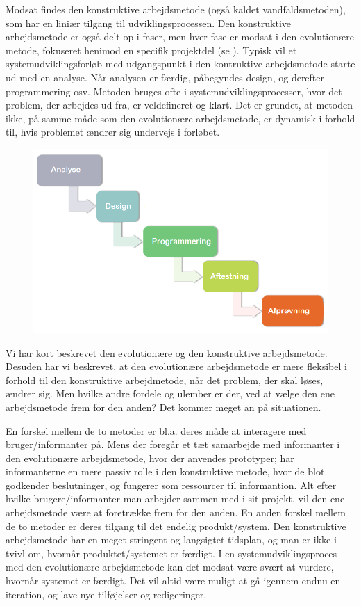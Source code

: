 Modsat findes den konstruktive arbejdsmetode (også kaldet vandfaldsmetoden), som har en liniær tilgang til udviklingsprocessen. Den konstruktive arbejdsmetode er også delt op i faser, men hver fase er modsat i den evolutionære metode, fokuseret henimod en specifik projektdel (se ). Typisk vil et systemudviklingsforløb med udgangspunkt i den kontruktive arbejdsmetode starte ud med en analyse. Når analysen er færdig, påbegyndes design, og derefter programmering osv. Metoden bruges ofte i systemudviklingsprocesser, hvor det problem, der arbejdes ud fra, er veldefineret og klart. Det er grundet, at metoden ikke, på samme måde som den evolutionære arbejdsmetode, er dynamisk i forhold til, hvis problemet ændrer sig undervejs i forløbet.

\begin{figure}[ht]
	\centering
	\includegraphics[scale=0.5]{billeder/konstruktivemetode.png}
  	\label{fig:konstruktivemetode}
\end{figure}

Vi har kort beskrevet den evolutionære og den konstruktive arbejdsmetode. Desuden har vi beskrevet, at den evolutionære arbejdsmetode er mere fleksibel i forhold til den konstruktive arbejdmetode, når det problem, der skal løses, ændrer sig. Men hvilke andre fordele og ulember er der, ved at vælge den ene arbejdsmetode frem for den anden? Det kommer meget an på situationen.

En forskel mellem de to metoder er bl.a. deres måde at interagere med bruger/informanter på. Mens der foregår et tæt samarbejde med informanter i den evolutionære arbejdsmetode, hvor der anvendes prototyper; har informanterne en mere passiv rolle i den konstruktive metode, hvor de blot godkender beslutninger, og fungerer som ressourcer til informantion. Alt efter hvilke brugere/informanter man arbejder sammen med i sit projekt, vil den ene arbejdsmetode være at foretrække frem for den anden. En anden forskel mellem de to metoder er deres tilgang til det endelig produkt/system. Den konstruktive arbejdsmetode har en meget stringent og langsigtet tidsplan, og man er ikke i tvivl om, hvornår produktet/systemet er færdigt. I en systemudviklingsproces med den evolutionære arbejdsmetode kan det modsat være svært at vurdere,  hvornår systemet er færdigt. Det vil altid være muligt at gå igennem endnu en iteration, og lave nye tilføjelser og redigeringer.


